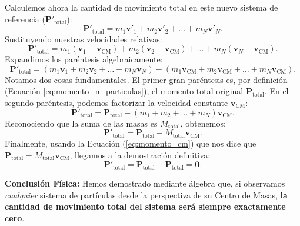 \documentclass[11pt,a4paper]{book}
\begin{document}
Calculemos ahora la cantidad de movimiento total en este nuevo sistema de referencia ($\boldsymbol{P}'_{\text{total}}$):
\begin{equation}
    \boldsymbol{P}'_{\text{total}} = m_1\boldsymbol{v}'_1 + m_2\boldsymbol{v}'_2 + \dots + m_N\boldsymbol{v}'_N.
\end{equation}
Sustituyendo nuestras velocidades relativas:
\begin{equation}
    \boldsymbol{P}'_{\text{total}} = m_1(\boldsymbol{v}_1 - \boldsymbol{v}_{\text{CM}}) + m_2(\boldsymbol{v}_2 - \boldsymbol{v}_{\text{CM}}) + \dots + m_N(\boldsymbol{v}_N - \boldsymbol{v}_{\text{CM}}).
\end{equation}
Expandimos los paréntesis algebraicamente:
\begin{equation}
    \boldsymbol{P}'_{\text{total}} = (m_1\boldsymbol{v}_1 + m_2\boldsymbol{v}_2 + \dots + m_N\boldsymbol{v}_N) - (m_1\boldsymbol{v}_{\text{CM}} + m_2\boldsymbol{v}_{\text{CM}} + \dots + m_N\boldsymbol{v}_{\text{CM}}).
\end{equation}
Notamos dos cosas fundamentales. El primer gran paréntesis es, por definición (Ecuación \ref{eq:momento_n_particulas}), el momento total original $\boldsymbol{P}_{\text{total}}$. En el segundo paréntesis, podemos factorizar la velocidad constante $\boldsymbol{v}_{\text{CM}}$:
\begin{equation}
    \boldsymbol{P}'_{\text{total}} = \boldsymbol{P}_{\text{total}} - (m_1 + m_2 + \dots + m_N)\boldsymbol{v}_{\text{CM}}.
\end{equation}
Reconociendo que la suma de las masas es $M_{\text{total}}$, obtenemos:
\begin{equation}
    \boldsymbol{P}'_{\text{total}} = \boldsymbol{P}_{\text{total}} - M_{\text{total}}\boldsymbol{v}_{\text{CM}}.
\end{equation}
Finalmente, usando la Ecuación (\ref{eq:momento_cm}) que nos dice que $\boldsymbol{P}_{\text{total}} = M_{\text{total}}\boldsymbol{v}_{\text{CM}}$, llegamos a la demostración definitiva:
\begin{equation}
    \boldsymbol{P}'_{\text{total}} = \boldsymbol{P}_{\text{total}} - \boldsymbol{P}_{\text{total}} = \boldsymbol{0}.
\end{equation}

\textbf{Conclusión Física:}
Hemos demostrado mediante álgebra que, si observamos \textit{cualquier} sistema de partículas desde la perspectiva de su Centro de Masas, \textbf{la cantidad de movimiento total del sistema será siempre exactamente cero}. 
\end{document}
